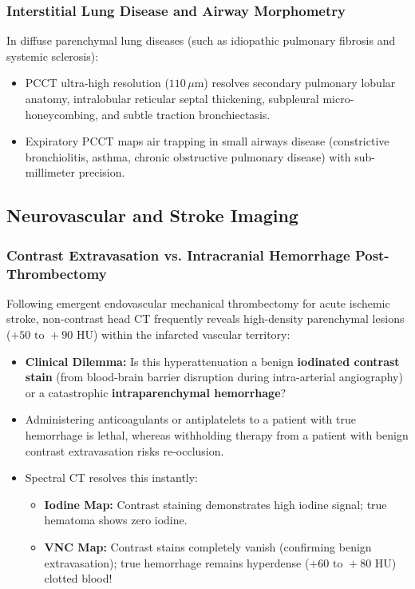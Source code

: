 \documentclass[11pt,a4paper]{article}
\begin{document}
\subsubsection{Interstitial Lung Disease and Airway Morphometry}
In diffuse parenchymal lung diseases (such as idiopathic pulmonary fibrosis and systemic sclerosis):
\begin{itemize}[leftmargin=2em]
    \item PCCT ultra-high resolution ($110\,\mu\text{m}$) resolves secondary pulmonary lobular anatomy, intralobular reticular septal thickening, subpleural micro-honeycombing, and subtle traction bronchiectasis.
    \item Expiratory PCCT maps air trapping in small airways disease (constrictive bronchiolitis, asthma, chronic obstructive pulmonary disease) with sub-millimeter precision.
\end{itemize}

\subsection{Neurovascular and Stroke Imaging}

\subsubsection{Contrast Extravasation vs. Intracranial Hemorrhage Post-Thrombectomy}
Following emergent endovascular mechanical thrombectomy for acute ischemic stroke, non-contrast head CT frequently reveals high-density parenchymal lesions ($+50\text{ to }+90\text{ HU}$) within the infarcted vascular territory:
\begin{itemize}[leftmargin=2em]
    \item \textbf{Clinical Dilemma:} Is this hyperattenuation a benign \textbf{iodinated contrast stain} (from blood-brain barrier disruption during intra-arterial angiography) or a catastrophic \textbf{intraparenchymal hemorrhage}?
    \item Administering anticoagulants or antiplatelets to a patient with true hemorrhage is lethal, whereas withholding therapy from a patient with benign contrast extravasation risks re-occlusion.
    \item Spectral CT resolves this instantly:
    \begin{itemize}
        \item \textbf{Iodine Map:} Contrast staining demonstrates high iodine signal; true hematoma shows zero iodine.
        \item \textbf{VNC Map:} Contrast stains completely vanish (confirming benign extravasation); true hemorrhage remains hyperdense ($+60\text{ to }+80\text{ HU}$) clotted blood!
    \end{itemize}
\end{itemize}
\end{document}
